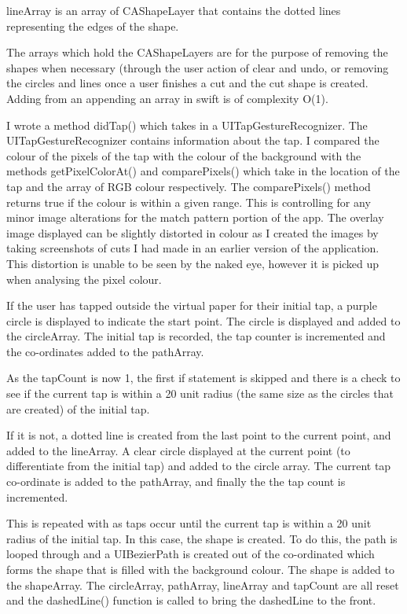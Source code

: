 \documentclass[11pt]{article}
\begin{document}
                 lineArray is an array of CAShapeLayer that contains the dotted lines representing the edges of the shape.
                 
                 The arrays which hold the CAShapeLayers are for the purpose of removing the shapes when necessary (through the user action of clear and undo, or removing the circles and lines once a user finishes a cut and the cut shape is created. Adding from an appending an array in swift is of complexity O(1). %
                 
                 I wrote a method didTap() which takes in a UITapGestureRecognizer. The UITapGestureRecognizer contains information about the tap. I compared the colour of the pixels of the tap with the colour of the background with the methods getPixelColorAt() and comparePixels() which take in the location of the tap and the array of RGB colour respectively. The comparePixels() method returns true if the colour is within a given range. This is controlling for any minor image alterations for the match pattern portion of the app. The overlay image displayed can be slightly distorted in colour as I created the images by taking screenshots of cuts I had made in an earlier version of the application. This distortion is unable to be seen by the naked eye, however it is picked up when analysing the pixel colour. 
                 
                 If the user has tapped outside the virtual paper for their initial tap, a purple circle is displayed to indicate the start point. The circle is displayed and added to the circleArray. The initial tap is recorded, the tap counter is incremented and the co-ordinates added to the pathArray. 
                 
                 As the tapCount is now 1, the first if statement is skipped and there is a check to see if the current tap is within a 20 unit radius (the same size as the circles that are created) of the initial tap. 
                 
                 If it is not, a dotted line is created from the last point to the current point, and added to the lineArray. A clear circle displayed at the current point (to differentiate from the initial tap) and added to the circle array. The current tap co-ordinate is added to the pathArray, and finally the the tap count is incremented.
                 
                 This is repeated with as taps occur until the current tap is within a 20 unit radius of the initial tap. In this case, the shape is created. To do this, the path is looped through and a UIBezierPath is created out of the co-ordinated which forms the shape that is filled with the background colour. The shape is added to the shapeArray. The circleArray, pathArray, lineArray and tapCount are all reset and the dashedLine() function is called to bring the dashedLine to the front. 
\end{document}

